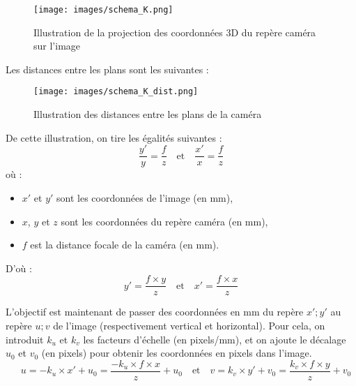 \documentclass[12pt]{article}
\begin{document}
\begin{figure}[H]
\centering
\texttt{[image: images/schema\_K.png]}
\caption{Illustration de la projection des coordonnées 3D du repère caméra sur l'image}
\label{fig:K_schema}
\end{figure}

Les distances entre les plans sont les suivantes :

\begin{figure}[H]
\centering
\texttt{[image: images/schema\_K\_dist.png]}
\caption{Illustration des distances entre les plans de la caméra}
\label{fig:K_dist_schema}
\end{figure}

De cette illustration, on tire les égalités suivantes :
\begin{equation}
    \frac{y'}{y} = \frac{f}{z}
    \quad \text{et} \quad \frac{x'}{x} = \frac{f}{z}
\end{equation}
où :
\begin{itemize}
    \item $x'$ et $y'$ sont les coordonnées de l'image (en mm),
    \item $x$, $y$ et $z$ sont les coordonnées du repère caméra (en mm),
    \item $f$ est la distance focale de la caméra  (en mm).
\end{itemize}
\vspace{1cm}

D'où :
\begin{equation}
    y' = \frac{f \times y}{z}
    \quad \text{et} \quad x' = \frac{f \times x}{z}
\end{equation}

L'objectif est maintenant de passer des coordonnées en mm du repère $x';y'$ au repère $u;v$ de l'image (respectivement vertical et horizontal).
Pour cela, on introduit $k_u$ et $k_v$ les facteurs d'échelle (en pixels/mm), et on ajoute le décalage $u_{0}$ et $v_{0}$ (en pixels) pour obtenir les coordonnées en pixels dans l'image.
\begin{equation}
    \quad u = - k_u \times x' + u_{0} = \frac{- k_u \times f \times x}{z} + u_{0}
    \quad \text{et} \quad v = k_v \times y' + v_{0} = \frac{k_v \times f \times y}{z} + v_{0}
\end{equation}
\end{document}
